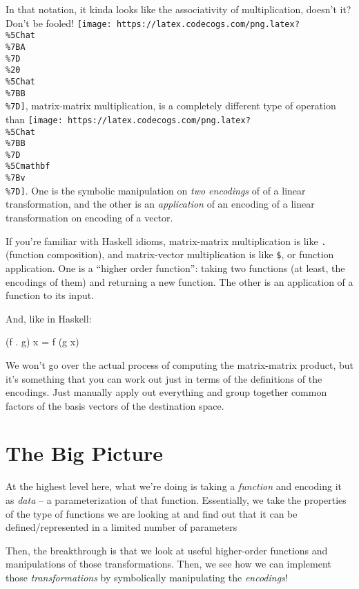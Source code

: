 \documentclass[]{article}
\newenvironment{Shaded}{}{}
\newcommand{\FunctionTok}[1]{\textcolor[rgb]{0.02,0.16,0.49}{#1}}
\newcommand{\NormalTok}[1]{#1}
\begin{document}
In that notation, it kinda looks like the associativity of multiplication,
doesn't it? Don't be fooled!
\texttt{[image: https://latex.codecogs.com/png.latex?\\\%5Chat\\\%7BA\\\%7D\\\%20\\\%5Chat\\\%7BB\\\%7D]},
matrix-matrix multiplication, is a completely different type of operation than
\texttt{[image: https://latex.codecogs.com/png.latex?\\\%5Chat\\\%7BB\\\%7D\\\%5Cmathbf\\\%7Bv\\\%7D]}.
One is the symbolic manipulation on \emph{two encodings} of of a linear
transformation, and the other is an \emph{application} of an encoding of a
linear transformation on encoding of a vector.

If you're familiar with Haskell idioms, matrix-matrix multiplication is like
\texttt{.} (function composition), and matrix-vector multiplication is like
\texttt{\$}, or function application. One is a ``higher order function'': taking
two functions (at least, the encodings of them) and returning a new function.
The other is an application of a function to its input.

And, like in Haskell:

\begin{Shaded}
\begin{Highlighting}[]
\NormalTok{(f }\FunctionTok{.}\NormalTok{ g) x }\FunctionTok{=}\NormalTok{ f (g x)}
\end{Highlighting}
\end{Shaded}

We won't go over the actual process of computing the matrix-matrix product, but
it's something that you can work out just in terms of the definitions of the
encodings. Just manually apply out everything and group together common factors
of the basis vectors of the destination space.

\hypertarget{the-big-picture}{%
\section{The Big Picture}\label{the-big-picture}}

At the highest level here, what we're doing is taking a \emph{function} and
encoding it as \emph{data} -- a parameterization of that function. Essentially,
we take the properties of the type of functions we are looking at and find out
that it can be defined/represented in a limited number of parameters

Then, the breakthrough is that we look at useful higher-order functions and
manipulations of those transformations. Then, we see how we can implement those
\emph{transformations} by symbolically manipulating the \emph{encodings}!
\end{document}
